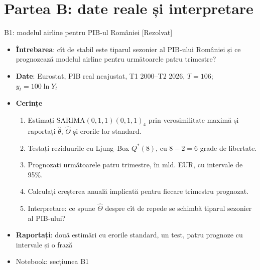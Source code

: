 \section{Partea B: date reale și interpretare}

\begin{frame}{B1: modelul airline pentru PIB-ul României [Rezolvat]}
\itemsize{\footnotesize}
\begin{itemize}
\item \textbf{Întrebarea}: cît de stabil este tiparul sezonier al PIB-ului României și ce prognozează modelul airline pentru următoarele patru trimestre?
\item \textbf{Date}: Eurostat, PIB real neajustat, T1 2000--T2 2026, $T = 106$; $y_t = 100\ln Y_t$
\item \textbf{Cerințe}
\begin{enumerate}
    \item Estimați SARIMA$(0,1,1)(0,1,1)_4$ prin verosimilitate maximă și raportați $\hat\theta$, $\hat\Theta$ și erorile lor standard.
    \item Testați reziduurile cu Ljung--Box $Q^*(8)$, cu $8 - 2 = 6$ grade de libertate.
    \item Prognozați următoarele patru trimestre, în mld. EUR, cu intervale de 95\%.
    \item Calculați creșterea anuală implicată pentru fiecare trimestru prognozat.
    \item Interpretare: ce spune $\hat\Theta$ despre cît de repede se schimbă tiparul sezonier al PIB-ului?
\end{enumerate}
\item \textbf{Raportați}: două estimări cu erorile standard, un test, patru prognoze cu intervale și o frază
\item Notebook: secțiunea B1
\end{itemize}
\end{frame}

